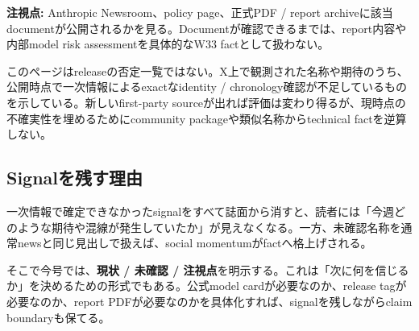 \textbf{注視点:} Anthropic Newsroom、policy page、正式PDF / report archiveに該当documentが公開されるかを見る。Documentが確認できるまでは、report内容や内部model risk assessmentを具体的なW33 factとして扱わない。

\begin{claimboundary}
このページはreleaseの否定一覧ではない。X上で観測された名称や期待のうち、公開時点で一次情報によるexactなidentity / chronology確認が不足しているものを示している。新しいfirst-party sourceが出れば評価は変わり得るが、現時点の不確実性を埋めるためにcommunity packageや類似名称からtechnical factを逆算しない。
\end{claimboundary}

\subsection*{Signalを残す理由}

一次情報で確定できなかったsignalをすべて誌面から消すと、読者には「今週どのような期待や混線が発生していたか」が見えなくなる。一方、未確認名称を通常newsと同じ見出しで扱えば、social momentumがfactへ格上げされる。

そこで今号では、\textbf{現状 / 未確認 / 注視点}を明示する。これは「次に何を信じるか」を決めるための形式でもある。公式model cardが必要なのか、release tagが必要なのか、report PDFが必要なのかを具体化すれば、signalを残しながらclaim boundaryも保てる。
